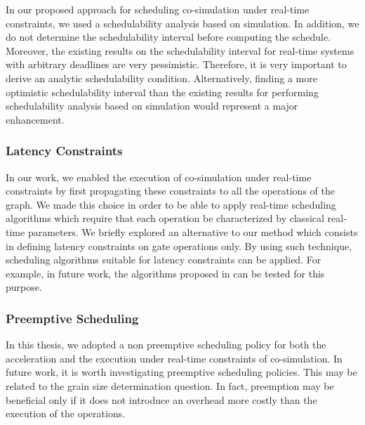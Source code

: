 In our proposed approach for scheduling co-simulation under real-time constraints, we used a schedulability analysis based on simulation. In addition, we do not determine the schedulability interval before computing the schedule. Moreover, the existing results on the schedulability interval for real-time systems with arbitrary deadlines are very pessimistic. Therefore, it is very important to derive an analytic schedulability condition. Alternatively, finding a more optimistic schedulability interval than the existing results for performing schedulability analysis based on simulation would represent a major enhancement.

\subsubsection{Latency Constraints}

In our work, we enabled the execution of co-simulation under real-time constraints by first propagating these constraints to all the operations of the graph. We made this choice in order to be able to apply real-time scheduling algorithms which require that each operation be characterized by classical real-time parameters. We briefly explored an alternative to our method which consists in defining latency constraints on gate operations only. By using such technique, scheduling algorithms suitable for latency constraints can be applied. For example, in future work, the algorithms proposed in \cite{kermia:2009} can be tested for this purpose.  

\subsubsection{Preemptive Scheduling} 
In this thesis, we adopted a non preemptive scheduling policy for both the acceleration and the execution under real-time constraints of co-simulation. In future work, it is worth investigating preemptive scheduling policies. This may be related to the grain size determination question. In fact, preemption may be beneficial only if it does not introduce an overhead more costly than the execution of the operations.

